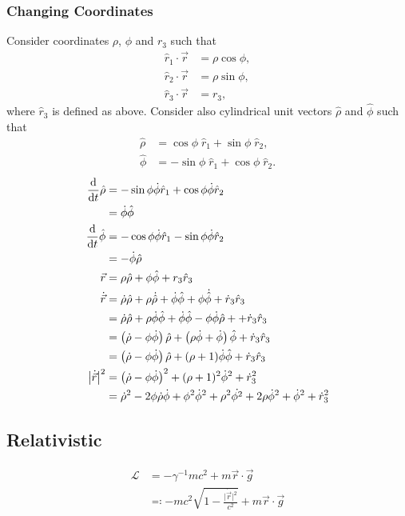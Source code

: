 \documentclass[12pt]{article}
\newcommand{\magsq}[1]{\big|#1\big|^2}
\newcommand{\Lag}{\mathcal{L}}
\newcommand{\pos}{\vec{r}}
\newcommand{\vel}{\dot{\vec{r}}}
\begin{document}
\subsubsection*{Changing Coordinates}
Consider coordinates $\rho$, $\phi$ and $r_3$ such that 
\begin{align*}
    \hat{r}_1\cdot{\pos} &= \rho\cos\phi, \\
    \hat{r}_2\cdot{\pos} &= \rho\sin\phi, \\
    \hat{r}_3\cdot{\pos} &= r_3,
\end{align*}
where $\hat{r}_3$ is defined as above. Consider also cylindrical unit vectors $\hat{\rho}$ and $\hat{\phi}$ such that
\begin{align*}
    \hat{\rho} &= \cos\phi\;\hat{r}_1 + \sin\phi\;\hat{r}_2, \\
    \hat{\phi} &= -\sin\phi\;\hat{r}_1 + \cos\phi\;\hat{r}_2.
\end{align*}
\begin{align*}
    \dv{t}\hat{\rho} &= -\sin\phi\dot{\phi}\hat{r}_1 + \cos\phi\dot{\phi}\hat{r}_2 \\
    &= \dot{\phi}\hat{\phi} \\
    \dv{t}\hat{\phi} &= -\cos\phi\dot{\phi}\hat{r}_1 - \sin\phi\dot{\phi}\hat{r}_2 \\
    &= -\dot{\phi}\hat{\rho} \\
    \pos &= \rho\hat{\rho} + \phi\hat{\phi} + r_3\hat{r}_3 \\
    \vel &= \dot{\rho}\hat{\rho} + \rho\dot{\hat{\rho}} + \dot{\phi}\hat{\phi} + \phi\dot{\hat{\phi}} + \dot{r}_3\hat{r}_3 \\
    &= \dot{\rho}\hat{\rho} + \rho\dot{\phi}\hat{\phi} + \dot{\phi}\hat{\phi} - \phi\dot{\phi}\hat{\rho} + + \dot{r}_3\hat{r}_3 \\
    &= \left(\dot{\rho} - \phi\dot{\phi}\right)\hat{\rho} + \left(\rho\dot{\phi} + \dot{\phi}\right)\hat{\phi} + \dot{r}_3\hat{r}_3 \\
    &= \left(\dot{\rho} - \phi\dot{\phi}\right)\hat{\rho} + (\rho + 1)\dot{\phi}\hat{\phi} + \dot{r}_3\hat{r}_3  \\
    \magsq{\vel} &= \left(\dot{\rho} - \phi\dot{\phi}\right)^2 + (\rho + 1)^2\dot{\phi}^2 + \dot{r}_3^2 \\
    &= \dot{\rho}^2 - 2\phi\dot{\rho}\dot{\phi} + \phi^2\dot{\phi}^2 + \rho^2\dot{\phi^2} + 2\rho\dot{\phi}^2 + \dot{\phi}^2 + \dot{r}_3^2
\end{align*}

\subsection*{Relativistic}
\begin{align*}
    \Lag &= -\gamma^{-1} mc^2 + m\pos\cdot\vec{g} \\
    &\eqqcolon -mc^2\sqrt{1 - \frac{\magsq{\vel}}{c^2}} + m\pos\cdot\vec{g}
\end{align*}
\end{document}
